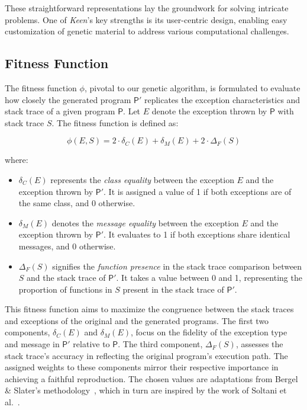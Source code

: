         These straightforward representations lay the groundwork for solving intricate problems. One of \textit{Keen}'s 
        key strengths is its user-centric design, enabling easy customization of genetic material to address various 
        computational challenges.


    \subsection{Fitness Function}
        The fitness function \(\phi\), pivotal to our genetic algorithm, is formulated to evaluate how closely the 
        generated program \(\mathsf{P'}\) replicates the exception characteristics and stack trace of a given program 
        \(\mathsf{P}\). Let \(E\) denote the exception thrown by \(\mathsf{P}\) with stack trace \(S\). The fitness 
        function is defined as:
    
        \begin{equation}
            \phi(E, S) = 2 \cdot \delta_C(E) + \delta_M(E) + 2 \cdot \Delta_F(S)
        \end{equation}
    
        where:
        \begin{itemize}
            \item \(\delta_C(E)\) represents the \textit{class equality} between the exception \(E\) and the exception 
                thrown by \(\mathsf{P'}\). It is assigned a value of 1 if both exceptions are of the same class, and 0 
                otherwise.
            \item \(\delta_M(E)\) denotes the \textit{message equality} between the exception \(E\) and the exception 
                thrown by \(\mathsf{P'}\). It evaluates to 1 if both exceptions share identical messages, and 0 
                otherwise.
            \item \(\Delta_F(S)\) signifies the \textit{function presence} in the stack trace comparison between \(S\) 
                and the stack trace of \(\mathsf{P'}\). It takes a value between 0 and 1, representing the proportion of
                functions in \(S\) present in the stack trace of \(\mathsf{P'}\).
        \end{itemize}
    
        This fitness function aims to maximize the congruence between the stack traces and exceptions of the original and 
        the generated programs. The first two components, \(\delta_C(E)\) and \(\delta_M(E)\), focus on the fidelity of 
        the exception type and message in \(\mathsf{P'}\) relative to \(\mathsf{P}\). The third component, \(\Delta_F(S)\), 
        assesses the stack trace's accuracy in reflecting the original program's execution path. The assigned weights to 
        these components mirror their respective importance in achieving a faithful reproduction. The chosen values are 
        adaptations from Bergel \& Slater's methodology~\autocite{bergelBeaconAutomatedTest2021}, which in turn are
        inspired by the work of Soltani et al.~\autocite{soltaniGuidedGeneticAlgorithm2017}.
    
